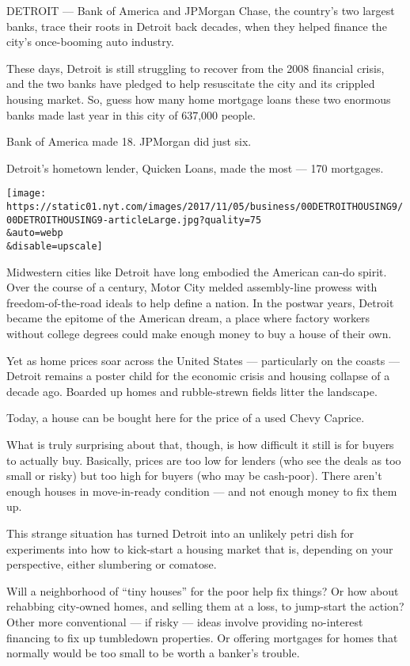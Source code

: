 DETROIT --- Bank of America and JPMorgan Chase, the country's two
largest banks, trace their roots in Detroit back decades, when they
helped finance the city's once-booming auto industry.

These days, Detroit is still struggling to recover from the 2008
financial crisis, and the two banks have pledged to help resuscitate the
city and its crippled housing market. So, guess how many home mortgage
loans these two enormous banks made last year in this city of 637,000
people.

Bank of America made 18. JPMorgan did just six.

Detroit's hometown lender, Quicken Loans, made the most --- 170
mortgages.

\texttt{[image: https://static01.nyt.com/images/2017/11/05/business/00DETROITHOUSING9/00DETROITHOUSING9-articleLarge.jpg?quality=75\\\&auto=webp\\\&disable=upscale]}

Midwestern cities like Detroit have long embodied the American can-do
spirit. Over the course of a century, Motor City melded assembly-line
prowess with freedom-of-the-road ideals to help define a nation. In the
postwar years, Detroit became the epitome of the American dream, a place
where factory workers without college degrees could make enough money to
buy a house of their own.

Yet as home prices soar across the United States --- particularly on the
coasts --- Detroit remains a poster child for the economic crisis and
housing collapse of a decade ago. Boarded up homes and rubble-strewn
fields litter the landscape.

Today, a house can be bought here for the price of a used Chevy Caprice.

What is truly surprising about that, though, is how difficult it still
is for buyers to actually buy. Basically, prices are too low for lenders
(who see the deals as too small or risky) but too high for buyers (who
may be cash-poor). There aren't enough houses in move-in-ready condition
--- and not enough money to fix them up.

This strange situation has turned Detroit into an unlikely petri dish
for experiments into how to kick-start a housing market that is,
depending on your perspective, either slumbering or comatose.

Will a neighborhood of ``tiny houses'' for the poor help fix things? Or
how about rehabbing city-owned homes, and selling them at a loss, to
jump-start the action? Other more conventional --- if risky --- ideas
involve providing no-interest financing to fix up tumbledown properties.
Or offering mortgages for homes that normally would be too small to be
worth a banker's trouble.

